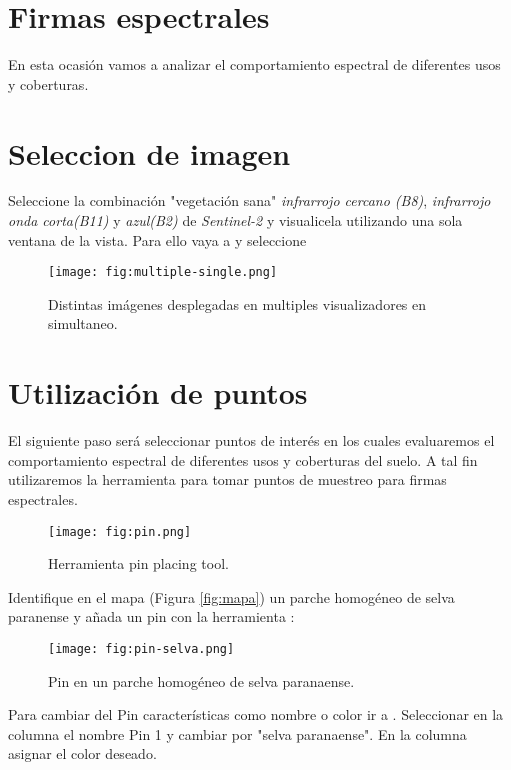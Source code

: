 \section{Firmas espectrales}


En esta ocasión vamos a analizar el comportamiento espectral de diferentes usos y coberturas.

\section{Seleccion de imagen}

Seleccione la combinación "vegetación sana" \emph{infrarrojo cercano (B8)}, \emph{infrarrojo onda corta(B11)} y \emph{azul(B2)} de \emph{Sentinel-2} y visualicela utilizando una sola ventana de la vista. Para ello vaya a  y seleccione 

\begin{figure}[h!]
    \centering
    \texttt{[image: fig:multiple-single.png]}
    \caption{Distintas imágenes desplegadas en multiples visualizadores en simultaneo.}
    \label{fig:multiples}
\end{figure}

\section{Utilización de puntos}

El siguiente paso será seleccionar puntos de interés en los cuales evaluaremos el comportamiento espectral de diferentes usos y coberturas del suelo. A tal fin utilizaremos la herramienta  para tomar puntos de muestreo para firmas espectrales.

\begin{figure}[h!]
    \centering
    \texttt{[image: fig:pin.png]}
    \caption{Herramienta pin placing tool.}
    \label{fig:pin}
\end{figure}

Identifique en el mapa (Figura \ref{fig:mapa}) un parche homogéneo de selva paranense y añada un pin con la herramienta :

\begin{figure}[h!]
    \centering
    \texttt{[image: fig:pin-selva.png]}
    \caption{Pin en un parche homogéneo de selva paranaense.}
    \label{fig:selva}
\end{figure}

Para cambiar del Pin características como nombre o color ir a  . Seleccionar en la columna  el nombre Pin 1 y cambiar por "selva paranaense". En la columna  asignar el color deseado.

